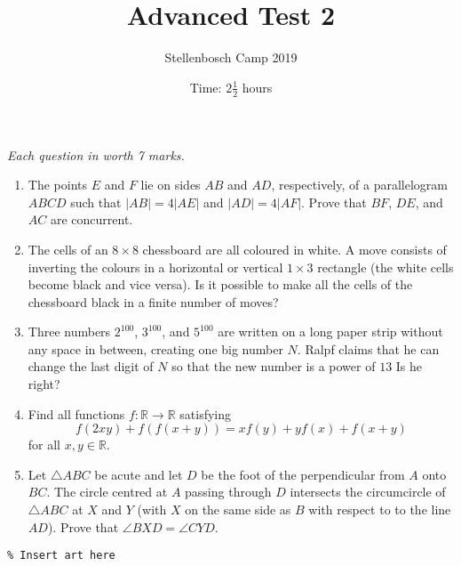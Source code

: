 \documentclass{article}
\title{Advanced Test 2}
\author{Stellenbosch Camp 2019}
\date{Time: $2\frac{1}{2}$ hours}
\begin{document}
\maketitle
\thispagestyle{empty}

\hfill\textit{Each question in worth 7 marks.}

\vspace{24pt}


\begin{enumerate}[1.]

\item %
The points $E$ and $F$ lie on sides $AB$ and $AD$, respectively, of a parallelogram $ABCD$ such that $|AB| = 4|AE|$ and $|AD| = 4|AF|$.
Prove that $BF$, $DE$, and $AC$ are concurrent.


\item %
The cells of an $8 \times 8$ chessboard are all coloured in white.
A move consists of inverting the colours in a horizontal or vertical $1 \times 3$ rectangle (the white cells become black and vice versa).
Is it possible to make all the cells of the chessboard black in a finite number of moves?


\item %
Three numbers $2^{100}$, $3^{100}$, and $5^{100}$ are written on a long paper strip without any space in between, creating one big number $N$.
Ralpf claims that he can change the last digit of $N$ so that the new number is a power of $13$
Is he right?


\item
Find all functions $f: \mathbb{R} \to \mathbb{R}$ satisfying
\[ f(2xy) +f(f(x+y)) = xf(y) + yf(x) +f(x+y) \]
for all $x,y \in \mathbb{R}$.


\item %
Let $\triangle ABC$ be acute and let $D$ be the foot of the perpendicular from $A$ onto $BC$.
The circle centred at $A$ passing through $D$ intersects the circumcircle of $\triangle ABC$ at $X$ and $Y$ (with $X$ on the same side as $B$ with respect to to the line $AD$).
Prove that $\angle BXD = \angle CYD$.

\end{enumerate}


\vfill
\begin{center}
\begin{BVerbatim}
\end{BVerbatim}
\end{center}
\end{document}
